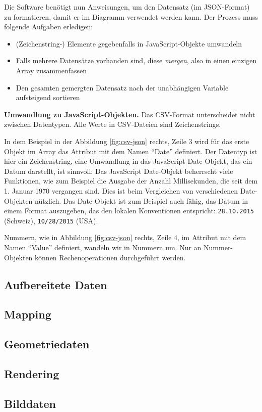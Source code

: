 Die Software benötigt nun Anweisungen, um den Datensatz (im JSON-Format) zu formatieren, damit er im Diagramm verwendet werden kann. Der Prozess muss folgende Aufgaben erledigen:

\begin{itemize}
	\item (Zeichenstring-) Elemente gegebenfalls in JavaScript-Objekte umwandeln
	\item Falls mehrere Datensätze vorhanden sind, diese \textit{mergen}, also in einen einzigen Array zusammenfassen
	\item Den gesamten gemergten Datensatz nach der unabhängigen Variable aufsteigend sortieren
\end{itemize}

\textbf{Umwandlung zu JavaScript-Objekten.} Das CSV-Format unterscheidet nicht zwischen Datentypen. Alle Werte in CSV-Dateien sind Zeichenstrings.

In dem Beispiel in der Abbildung \ref{fig:csv-json} rechts, Zeile 3 wird für das erste Objekt im Array das Attribut mit dem Namen "`Date"' definiert. Der Datentyp ist hier ein Zeichenstring, eine Umwandlung in das JavaScript-Date-Objekt, das ein Datum darstellt, ist sinnvoll: Das JavaScript Date-Objekt beherrscht viele Funktionen, wie zum Beispiel die Ausgabe der Anzahl Millisekunden, die seit dem 1. Januar 1970 vergangen sind. Dies ist beim Vergleichen von verschiedenen Date-Objekten nützlich. Das Date-Objekt ist zum Beispiel auch fähig, das Datum in einem Format auszugeben, das den lokalen Konventionen entspricht: \lstinline|28.10.2015| (Schweiz), \lstinline|10/28/2015| (USA).

Nummern, wie in Abbildung \ref{fig:csv-json} rechts, Zeile 4, im Attribut mit dem Namen "`Value"' definiert, wandeln wir in Nummern um. Nur an Nummer-Objekten können Rechenoperationen durchgeführt werden.

\subsection{Aufbereitete Daten}

\subsection{Mapping}

\subsection{Geometriedaten}

\subsection{Rendering}

\subsection{Bilddaten}